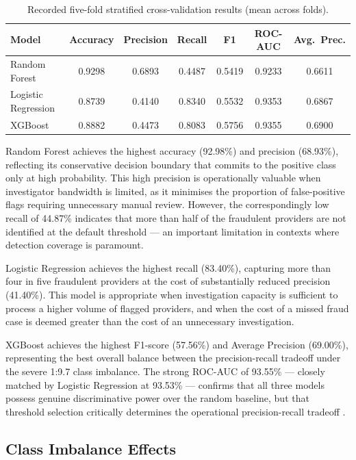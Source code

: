 \begin{table}[htbp]
\centering
\caption{Recorded five-fold stratified cross-validation results (mean across folds).}
\label{tab:cv-results}
\begin{tabular}{@{}lcccccc@{}}
\toprule
\textbf{Model} & \textbf{Accuracy} & \textbf{Precision} & \textbf{Recall} & \textbf{F1} & \textbf{ROC-AUC} & \textbf{Avg.\ Prec.} \\
\midrule
Random Forest       & 0.9298 & 0.6893 & 0.4487 & 0.5419 & 0.9233 & 0.6611 \\
Logistic Regression & 0.8739 & 0.4140 & 0.8340 & 0.5532 & 0.9353 & 0.6867 \\
XGBoost             & 0.8882 & 0.4473 & 0.8083 & 0.5756 & 0.9355 & 0.6900 \\
\bottomrule
\end{tabular}
\end{table}

Random Forest achieves the highest accuracy (92.98\%) and precision (68.93\%), reflecting its conservative decision boundary that commits to the positive class only at high probability. This high precision is operationally valuable when investigator bandwidth is limited, as it minimises the proportion of false-positive flags requiring unnecessary manual review. However, the correspondingly low recall of 44.87\% indicates that more than half of the fraudulent providers are not identified at the default threshold --- an important limitation in contexts where detection coverage is paramount.

Logistic Regression achieves the highest recall (83.40\%), capturing more than four in five fraudulent providers at the cost of substantially reduced precision (41.40\%). This model is appropriate when investigation capacity is sufficient to process a higher volume of flagged providers, and when the cost of a missed fraud case is deemed greater than the cost of an unnecessary investigation.

XGBoost achieves the highest F1-score (57.56\%) and Average Precision (69.00\%), representing the best overall balance between the precision-recall tradeoff under the severe 1:9.7 class imbalance. The strong ROC-AUC of 93.55\% --- closely matched by Logistic Regression at 93.53\% --- confirms that all three models possess genuine discriminative power over the random baseline, but that threshold selection critically determines the operational precision-recall tradeoff \cite{b4}.

\subsection{Class Imbalance Effects}

